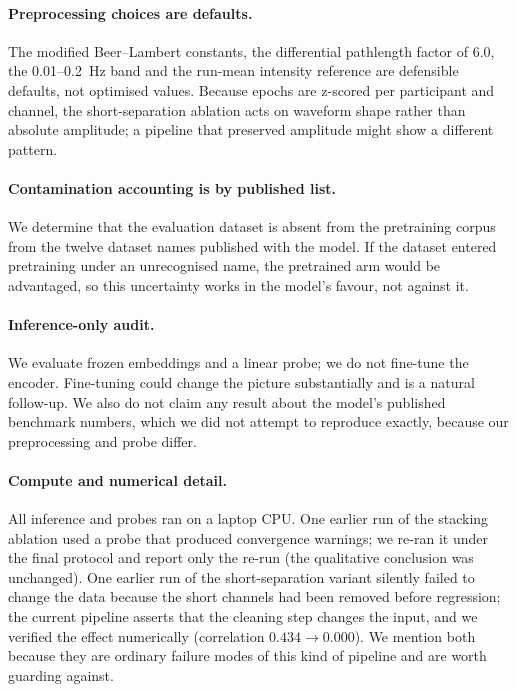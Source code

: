 \paragraph{Preprocessing choices are defaults.} The modified Beer--Lambert constants, the
differential pathlength factor of 6.0, the 0.01--0.2~Hz band and the run-mean intensity reference
are defensible defaults, not optimised values. Because epochs are z-scored per participant and
channel, the short-separation ablation acts on waveform shape rather than absolute amplitude;
a pipeline that preserved amplitude might show a different pattern.

\paragraph{Contamination accounting is by published list.} We determine that the evaluation
dataset is absent from the pretraining corpus from the twelve dataset names published with the
model. If the dataset entered pretraining under an unrecognised name, the pretrained arm would
be advantaged, so this uncertainty works in the model's favour, not against it.

\paragraph{Inference-only audit.} We evaluate frozen embeddings and a linear probe; we do not
fine-tune the encoder. Fine-tuning could change the picture substantially and is a natural
follow-up. We also do not claim any result about the model's published benchmark numbers, which
we did not attempt to reproduce exactly, because our preprocessing and probe differ.

\paragraph{Compute and numerical detail.} All inference and probes ran on a laptop CPU. One
earlier run of the stacking ablation used a probe that produced convergence warnings; we re-ran
it under the final protocol and report only the re-run (the qualitative conclusion was
unchanged). One earlier run of the short-separation variant silently failed to change the data
because the short channels had been removed before regression; the current pipeline asserts that
the cleaning step changes the input, and we verified the effect numerically (correlation
$0.434 \to 0.000$). We mention both because they are ordinary failure modes of this kind of
pipeline and are worth guarding against.
